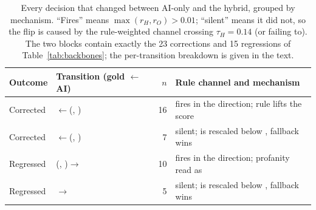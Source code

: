 ﻿\begin{table}[t]
\centering
\scriptsize
\setlength{\tabcolsep}{5pt}
\caption{Every decision that changed between AI-only and the hybrid, grouped by
mechanism. ``Fires'' means $\max(r_H,r_O)>0.01$; ``silent'' means it did not, so
the flip is caused by the rule-weighted \hate{} channel crossing $\tau_H=0.14$ (or
failing to). The two blocks contain exactly the 23 corrections and 15 regressions
of Table~\ref{tab:backbones}; the per-transition breakdown is given in the text.}
\label{tab:transitions}
\begin{tabular}{llrl}
\toprule
Outcome & Transition (gold $\leftarrow$ AI) & $n$ & Rule channel and mechanism \\
\midrule
Corrected & \hate{}$\leftarrow$(\off{}, \clean{}) & 16 & fires in the \hate{} direction; rule lifts the score \\
Corrected & \clean{}$\leftarrow$(\hate{}, \off{})  &  7 & silent; \hate{} is rescaled below \clean{}, fallback wins \\
Regressed & (\off{}, \clean{})$\to$\hate{}          & 10 & fires in the \hate{} direction; profanity read as \hate{} \\
Regressed & \hate{}$\to$\clean{}                    &  5 & silent; \hate{} is rescaled below \clean{}, fallback wins \\
\bottomrule
\end{tabular}
\end{table}
